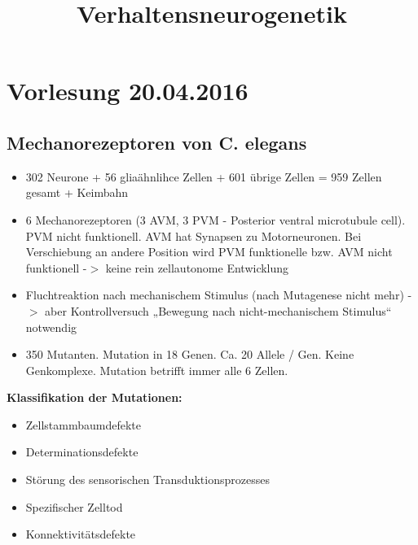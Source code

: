 \documentclass[12pt,a4paper]{article}
\title{Verhaltensneurogenetik}
\author{}
\date{}
\begin{document}
\begin{titlepage}

\maketitle
\thispagestyle{empty}
\end{titlepage}
\newpage

\begin{titlepage}
\tableofcontents
\thispagestyle{empty}
\end{titlepage}
\newpage

\section{Vorlesung 20.04.2016}

\subsection{Mechanorezeptoren von C. elegans}
\begin{itemize}
	\item 302 Neurone + 56 gliaähnlihce Zellen + 601 übrige Zellen = 959 Zellen gesamt + Keimbahn
	\item 6 Mechanorezeptoren (3 AVM, 3 PVM - Posterior ventral microtubule cell). PVM nicht funktionell. AVM hat Synapsen zu Motorneuronen. Bei Verschiebung an andere Position wird PVM funktionelle bzw. AVM nicht funktionell -$>$ keine rein zellautonome Entwicklung
	\item Fluchtreaktion nach mechanischem Stimulus (nach Mutagenese nicht mehr) -$>$ aber Kontrollversuch „Bewegung nach nicht-mechanischem Stimulus“ notwendig
	\item 350 Mutanten. Mutation in 18 Genen. Ca. 20 Allele / Gen. Keine Genkomplexe. Mutation betrifft immer alle 6 Zellen.
\end{itemize}

\textbf{Klassifikation der Mutationen:}
\begin{itemize}
	\item Zellstammbaumdefekte
	\item Determinationsdefekte
	\item Störung des sensorischen Transduktionsprozesses
	\item Spezifischer Zelltod
	\item Konnektivitätsdefekte
\end{itemize}
\end{document}
